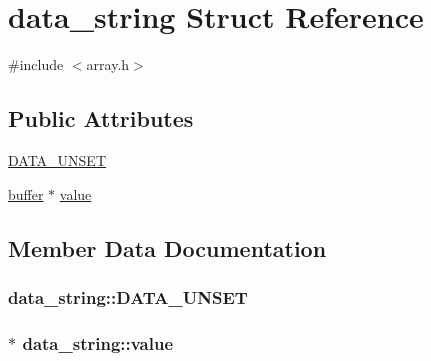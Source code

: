 \hypertarget{structdata__string}{\section{data\-\_\-string Struct Reference}
\label{structdata__string}
}


{\ttfamily \#include $<$array.\-h$>$}

\subsection*{Public Attributes}
\begin{DoxyCompactItemize}
\item 
\hyperlink{structdata__string_a701f2eb7b72bd2d52bc35a3bf27098ba}{D\-A\-T\-A\-\_\-\-U\-N\-S\-E\-T}
\item 
\hyperlink{structbuffer}{buffer} $\ast$ \hyperlink{structdata__string_adc361b860624ff2f0702c274acfa6c03}{value}
\end{DoxyCompactItemize}


\subsection{Member Data Documentation}
\hypertarget{structdata__string_a701f2eb7b72bd2d52bc35a3bf27098ba}{
\subsubsection[{D\-A\-T\-A\-\_\-\-U\-N\-S\-E\-T}]{\setlength{\rightskip}{0pt plus 5cm}data\-\_\-string\-::\-D\-A\-T\-A\-\_\-\-U\-N\-S\-E\-T}}\label{structdata__string_a701f2eb7b72bd2d52bc35a3bf27098ba}
\hypertarget{structdata__string_adc361b860624ff2f0702c274acfa6c03}{
\subsubsection[{value}]{$\ast$ data\-\_\-string\-::value}}\label{structdata__string_adc361b860624ff2f0702c274acfa6c03}


